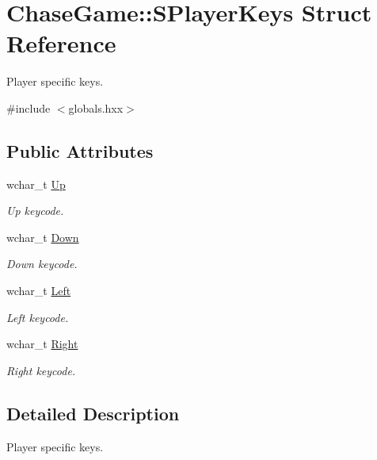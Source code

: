 \hypertarget{struct_chase_game_1_1_s_player_keys}{\section{Chase\-Game\-:\-:S\-Player\-Keys Struct Reference}
\label{struct_chase_game_1_1_s_player_keys}
}


Player specific keys.  




{\ttfamily \#include $<$globals.\-hxx$>$}

\subsection*{Public Attributes}
\begin{DoxyCompactItemize}
\item 
wchar\-\_\-t \hyperlink{struct_chase_game_1_1_s_player_keys_a0153d90bee31d3959e7a79377c4dd927}{Up}
\begin{DoxyCompactList}\small\item\em Up keycode. \end{DoxyCompactList}\item 
wchar\-\_\-t \hyperlink{struct_chase_game_1_1_s_player_keys_abe56af951c133c98b24401542f28ec9b}{Down}
\begin{DoxyCompactList}\small\item\em Down keycode. \end{DoxyCompactList}\item 
wchar\-\_\-t \hyperlink{struct_chase_game_1_1_s_player_keys_ab6c4f7e03fa43cd9443dcbd16a5e3250}{Left}
\begin{DoxyCompactList}\small\item\em Left keycode. \end{DoxyCompactList}\item 
wchar\-\_\-t \hyperlink{struct_chase_game_1_1_s_player_keys_a17ec0fea68ec78ad4577c6b56b83fa15}{Right}
\begin{DoxyCompactList}\small\item\em Right keycode. \end{DoxyCompactList}\end{DoxyCompactItemize}


\subsection{Detailed Description}
Player specific keys. 

